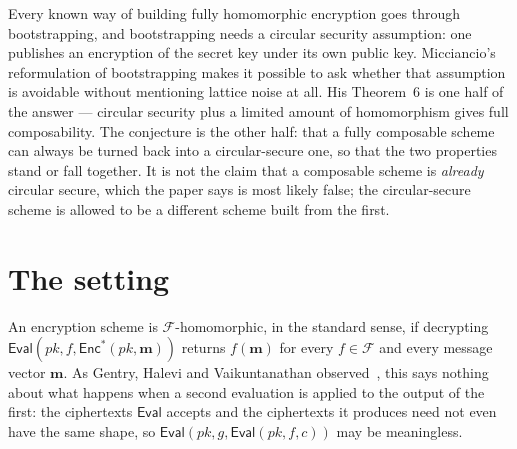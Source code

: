 \documentclass{aicr-conjecture}
\newcommand{\Enc}{\mathsf{Enc}}
\newcommand{\Eval}{\mathsf{Eval}}
\newcommand{\Fset}{\mathcal{F}}
\begin{document}

\vspace{0.4em}

\begin{informalconjecture}
Every known way of building fully homomorphic encryption goes through
bootstrapping, and bootstrapping needs a circular security assumption:
one publishes an encryption of the secret key under its own public key.
Micciancio's reformulation of bootstrapping makes it possible to ask
whether that assumption is avoidable without mentioning lattice noise
at all. His Theorem~6 is one half of the answer --- circular security
plus a limited amount of homomorphism gives full composability. The
conjecture is the other half: that a fully composable scheme can always
be turned back into a circular-secure one, so that the two properties
stand or fall together. It is not the claim that a composable scheme is
\emph{already} circular secure, which the paper says is most likely
false; the circular-secure scheme is allowed to be a different scheme
built from the first.
\end{informalconjecture}

\section{The setting}\label{sec:setting}

An encryption scheme is $\Fset$-homomorphic, in the standard sense, if
decrypting $\Eval(pk, f, \Enc^{*}(pk, \mathbf{m}))$ returns
$f(\mathbf{m})$ for every $f \in \Fset$ and every message vector
$\mathbf{m}$. As Gentry, Halevi and Vaikuntanathan
observed~\cite{GHV10}, this says nothing about what happens when a
second evaluation is applied to the output of the first: the
ciphertexts $\Eval$ accepts and the ciphertexts it produces need not
even have the same shape, so $\Eval(pk, g, \Eval(pk, f, c))$ may be
meaningless.
\end{document}
